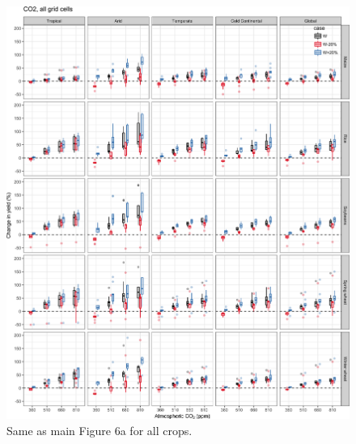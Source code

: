\documentclass[10pt]{article}
\begin{document}
\begin{figure}[h!]
\centering
\includegraphics[width=\textwidth]{s_sim_CG_C.png}
\caption{Same as main Figure 6a for all crops.}
\label{fig:carbon}
\end{figure}
\end{document}
